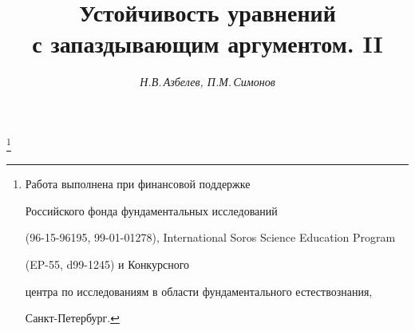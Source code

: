 









\newcommand{\col}{\operatorname{col}}


\newcommand{\spc}[1]{\bold {#1}}


\newcommand{\eqdef}{\overset{\mathrm{def}}{=}{}}


\newcommand{\vraisup}{\operatornamewithlimits{vrai\,sup}}


\newcommand{\vraiinf}{\operatornamewithlimits{vrai\,inf}}


\newcommand{\tts}[1]{}







\setcounter{page}{3}















\author{\it Н.В.\,Азбелев, П.М.\,Симонов}




\title{Устойчивость уравнений\\ с запаздывающим аргументом. II}


\thanks{Работа выполнена при финансовой поддержке


Российского фонда фундаментальных исследований


(96-15-96195, 99-01-01278), International Soros Science Education Program


(EP-55, d99-1245) и Конкурсного


центра по исследованиям в области фундаментального естествознания,


Санкт-Петербург.}





